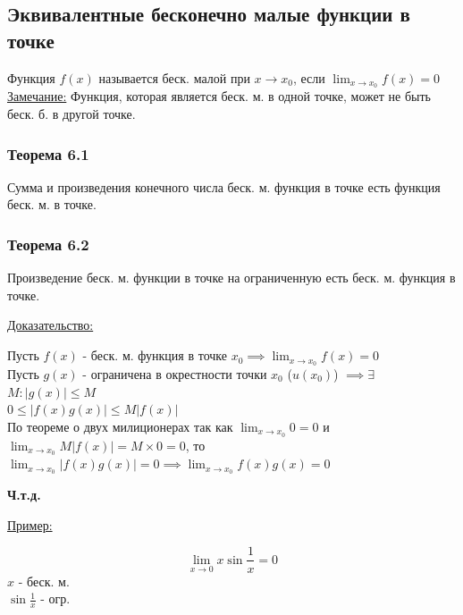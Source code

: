 \documentclass[12pt]{article}
\begin{document}
    \subsection{Эквивалентные бесконечно малые функции в точке}
    \noindent Функция $f(x)$ называется беск. малой при $x \to x_0$, если $\lim_{x \to x_0}f(x) = 0$\\
    \underline{Замечание:} Функция, которая является беск. м. в одной точке, может не быть беск. б. в другой точке.\par\noindent
    \subsubsection*{Теорема 6.1}
    Сумма и произведения конечного числа беск. м. функция в точке есть функция беск. м. в точке.
    \subsubsection*{Теорема 6.2}
    Произведение беск. м. функции в точке на ограниченную есть беск. м. функция в точке.\par\noindent
    \underline{Доказательство:}
    \begin{adjustwidth}{1.5em}{1.5em}
        Пусть $f(x)$ - беск. м. функция в точке $x_0 \implies \lim_{x\to x_0}f(x)=0$\\
        Пусть $g(x)$ - ограничена в окрестности точки $x_0$ ($u(x_0)$) $\implies \exists$ $M : |g(x)| \le M$\\
        $0 \le |f(x)g(x)| \le M|f(x)|$\\
        По теореме о двух милиционерах так как $\lim_{x\to x_0}0 = 0$ и $\lim_{x\to x_0}M|f(x)| = M \times 0 = 0$, то $\lim_{x\to x_0}|f(x)g(x)| = 0 \implies \lim_{x\to x_0}f(x)g(x) = 0$
        \begin{center}
            \textbf{Ч.т.д.}
        \end{center}
    \end{adjustwidth}
    \underline{Пример:}
    \begin{adjustwidth}{1.5em}{1.5em}
        \[\lim_{x\to0} x\sin \frac{1}{x} = 0\]
        $x$ - беск. м.\\
        $\sin \frac{1}{x}$ - огр.
    \end{adjustwidth}
\end{document}

